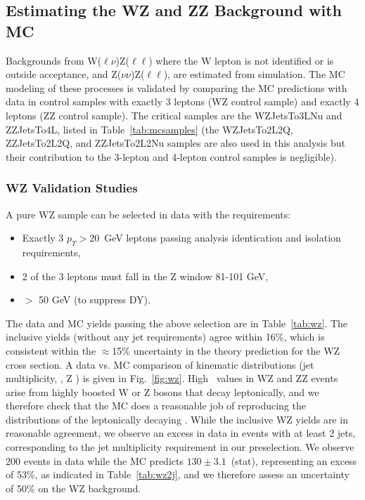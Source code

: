 \clearpage

\subsection{Estimating the WZ and ZZ Background with MC}
\label{sec:bkg_vz}

Backgrounds from W($\ell\nu$)Z($\ell\ell$) where the W lepton is not identified or is outside acceptance, and Z($\nu\nu$)Z($\ell\ell$),
are estimated from simulation. The MC modeling of these processes is validated by comparing the MC predictions with data in control samples
with exactly 3 leptons (WZ control sample) and exactly 4 leptons (ZZ control sample). 
The critical samples are the WZJetsTo3LNu and ZZJetsTo4L, listed in Table~\ref{tab:mcsamples}
(the WZJetsTo2L2Q, ZZJetsTo2L2Q, and ZZJetsTo2L2Nu samples are also used in this analysis but their contribution to the 3-lepton and 4-lepton
control samples is negligible).

\subsubsection{WZ Validation Studies}
\label{sec:bkg_wz}

A pure WZ sample can be selected in data with the requirements:

\begin{itemize}
\item Exactly 3 $p_T>20$~GeV leptons passing analysis identication and isolation requirements,
\item 2 of the 3 leptons must fall in the Z window 81-101 GeV,
\item \MET $>$ 50 GeV (to suppress DY).
\end{itemize}

The data and MC yields passing the above selection are in Table~\ref{tab:wz}. 
The inclusive yields (without any jet requirements) agree within 16\%, which is consistent within
the $\approx$15\% uncertainty in the theory prediction for the WZ cross section. A data vs. MC comparison of kinematic
distributions (jet multiplicity, \MET, Z \pt) is given in Fig.~\ref{fig:wz}. High \MET\ 
values in WZ and ZZ events arise from highly boosted W or Z bosons that decay leptonically, 
and we therefore check that the MC does a reasonable job of reproducing the \pt distributions of the 
leptonically decaying \Z. While the inclusive WZ yields are in reasonable agreement, we observe
an excess in data in events with at least 2 jets, corresponding to the jet multiplicity requirement
in our preselection. We observe 200 events in data while the MC predicts $130\pm3.1$~(stat), representing an excess of 53\%,
as indicated in Table~\ref{tab:wz2j}, and we therefore assess an uncertainty of 50\% on the WZ background.

